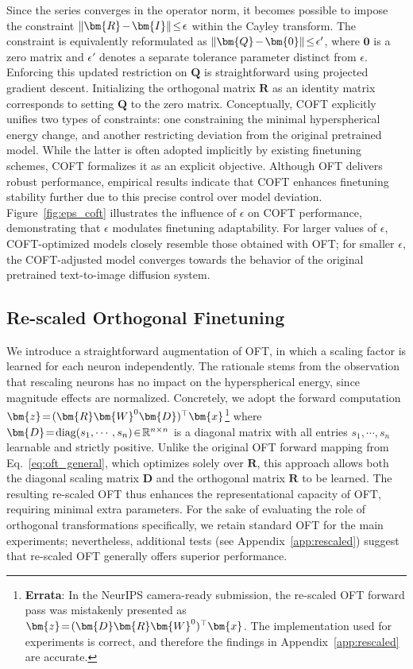 Since the series converges in the operator norm, it becomes possible to impose the constraint $\thickmuskip=2mu \medmuskip=2mu\|\bm{R}-\bm{I}\|\leq\epsilon$ within the Cayley transform. The constraint is equivalently reformulated as $\thickmuskip=2mu \medmuskip=2mu \|\bm{Q}-\bm{0}\|\leq\epsilon'$, where $\bm{0}$ is a zero matrix and $\epsilon'$ denotes a separate tolerance parameter distinct from $\epsilon$. Enforcing this updated restriction on $\bm{Q}$ is straightforward using projected gradient descent. Initializing the orthogonal matrix $\bm{R}$ as an identity matrix corresponds to setting $\bm{Q}$ to the zero matrix. Conceptually, COFT explicitly unifies two types of constraints: one constraining the minimal hyperspherical energy change, and another restricting deviation from the original pretrained model. While the latter is often adopted implicitly by existing finetuning schemes, COFT formalizes it as an explicit objective. Although OFT delivers robust performance, empirical results indicate that COFT enhances finetuning stability further due to this precise control over model deviation. Figure~\ref{fig:eps_coft} illustrates the influence of $\epsilon$ on COFT performance, demonstrating that $\epsilon$ modulates finetuning adaptability. For larger values of $\epsilon$, COFT-optimized models closely resemble those obtained with OFT; for smaller $\epsilon$, the COFT-adjusted model converges towards the behavior of the original pretrained text-to-image diffusion system.

\subsection{Re-scaled Orthogonal Finetuning}

We introduce a straightforward augmentation of OFT, in which a scaling factor is learned for each neuron independently. The rationale stems from the observation that rescaling neurons has no impact on the hyperspherical energy, since magnitude effects are normalized. Concretely, we adopt the forward computation $\thickmuskip=2mu \medmuskip=2mu\bm{z}=(\bm{R}\bm{W}^0\bm{D})^\top\bm{x}$\footnote{\textbf{Errata}: In the NeurIPS camera-ready submission, the re-scaled OFT forward pass was mistakenly presented as $\thickmuskip=2mu \medmuskip=2mu\bm{z}=(\bm{D}\bm{R}\bm{W}^0)^\top\bm{x}$. The implementation used for experiments is correct, and therefore the findings in Appendix~\ref{app:rescaled} are accurate.} where $\thickmuskip=2mu \medmuskip=2mu \bm{D}=\text{diag}(s_1,\cdots,s_n)\in\mathbb{R}^{n\times n}$ is a diagonal matrix with all entries $s_1,\cdots,s_n$ learnable and strictly positive. Unlike the original OFT forward mapping from Eq.~\eqref{eq:oft_general}, which optimizes solely over $\bm{R}$, this approach allows both the diagonal scaling matrix $\bm{D}$ and the orthogonal matrix $\bm{R}$ to be learned. The resulting re-scaled OFT thus enhances the representational capacity of OFT, requiring minimal extra parameters. For the sake of evaluating the role of orthogonal transformations specifically, we retain standard OFT for the main experiments; nevertheless, additional tests (see Appendix~\ref{app:rescaled}) suggest that re-scaled OFT generally offers superior performance.

